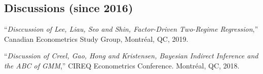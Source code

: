\documentclass[12pt]{article}
\begin{document}




\subsection*{Discussions (since 2016)}

``{\it Disccussion of Lee, Liau, Seo and Shin, Factor-Driven Two-Regime Regression},''
Canadian Econometrics Study Group,
Montr\'eal, QC,
2019.

``{\it Discussion of Creel, Gao, Hong and Kristensen, Bayesian Indirect Inference and the ABC of GMM},''
CIREQ Econometrics Conference.
Montr\'eal, QC,
2018.




 

\end{document}
